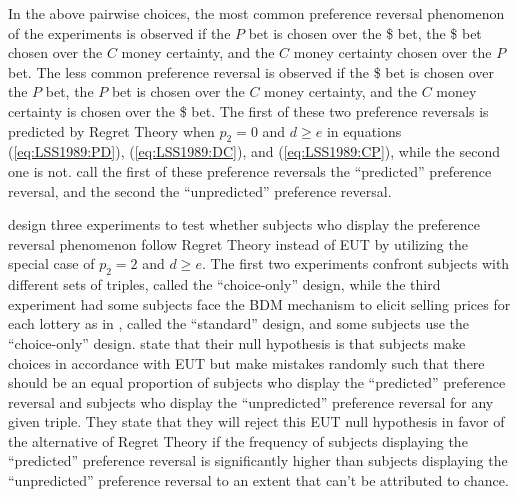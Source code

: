 \documentclass[../main.tex]{subfiles}
\begin{document}
In the above pairwise choices, the most common preference reversal phenomenon of the \textcite{Grether1979} experiments is observed if the $P$ bet is chosen over the {\$} bet, the {\$} bet chosen over the $C$ money certainty, and the $C$ money certainty chosen over the $P$ bet.
The less common preference reversal is observed if the {\$} bet is chosen over the $P$ bet, the $P$ bet is chosen over the $C$ money certainty, and the $C$ money certainty is chosen over the {\$} bet.
The first of these two preference reversals is predicted by Regret Theory when $p_2 =0$ and $d \geq e$ in equations (\ref{eq:LSS1989:PD}), (\ref{eq:LSS1989:DC}), and (\ref{eq:LSS1989:CP}), while the second one is not.
\textcite[143]{Loomes1989} call the first of these preference reversals the \enquote{predicted} preference reversal, and the second the \enquote{unpredicted} preference reversal.

\textcite{Loomes1989} design three experiments to test whether subjects who display the preference reversal phenomenon follow Regret Theory instead of EUT by utilizing the special case of $p_2 = 2$ and $d \geq e$.
The first two experiments confront subjects with different sets of triples, called the \enquote{choice-only} design, while the third experiment had some subjects face the BDM mechanism to elicit selling prices for each lottery as in \textcite{Grether1979}, called the \enquote{standard} design, and some subjects use the \enquote{choice-only} design.
\textcite[142]{Loomes1989} state that their null hypothesis is that subjects make choices in accordance with EUT but make mistakes randomly such that there should be an equal proportion of subjects who display the \enquote{predicted} preference reversal and subjects who display the \enquote{unpredicted} preference reversal for any given triple.
They state that they will reject this EUT null hypothesis in favor of the alternative of Regret Theory if the frequency of subjects displaying the \enquote{predicted} preference reversal is significantly higher than subjects displaying the \enquote{unpredicted} preference reversal to an extent that can't be attributed to chance.
\end{document}
